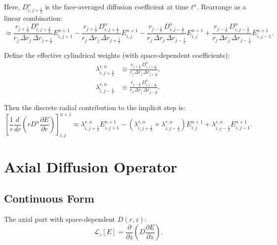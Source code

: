 \documentclass[12pt,oneside]{article}
\begin{document}
Here, $D^n_{i,j+\frac12}$ is the face-averaged diffusion coefficient at time $t^n$. Rearrange as a linear combination:
\begin{equation}
\approx
\frac{r_{j+\frac12}\,D^n_{i,j+\frac12}}{r_j\,\Delta r_j\,\Delta r_{j+\frac12}} E^{n+1}_{i,j+1}
-
\frac{r_{j+\frac12}\,D^n_{i,j+\frac12}}{r_j\,\Delta r_j\,\Delta r_{j+\frac12}} E^{n+1}_{i,j}
-
\frac{r_{j-\frac12}\,D^n_{i,j-\frac12}}{r_j\,\Delta r_j\,\Delta r_{j-\frac12}} E^{n+1}_{i,j}
+
\frac{r_{j-\frac12}\,D^n_{i,j-\frac12}}{r_j\,\Delta r_j\,\Delta r_{j-\frac12}} E^{n+1}_{i,j-1}.
\end{equation}

Define the effective cylindrical weights (with space-dependent coefficients):
\begin{align}
\lambda^{r,n}_{i,j+\frac12}
&\equiv
\frac{r_{j+\frac12}\,D^n_{i,j+\frac12}}{r_j\,\Delta r_j\,\Delta r_{j+\frac12}},\\
\lambda^{r,n}_{i,j-\frac12}
&\equiv
\frac{r_{j-\frac12}\,D^n_{i,j-\frac12}}{r_j\,\Delta r_j\,\Delta r_{j-\frac12}}.
\end{align}

Then the discrete radial contribution to the implicit step is:
\begin{equation}
\left[\frac{1}{r}\frac{d}{dr}\left(rD^n\frac{\partial E}{\partial r}\right)\right]_{i,j}^{n+1}
\approx
\lambda^{r,n}_{i,j+\frac12} E^{n+1}_{i,j+1}
-
\left(\lambda^{r,n}_{i,j+\frac12} + \lambda^{r,n}_{i,j-\frac12}\right) E^{n+1}_{i,j}
+
\lambda^{r,n}_{i,j-\frac12} E^{n+1}_{i,j-1}.
\label{eq:radial_stencil}
\end{equation}

\section{Axial Diffusion Operator}

\subsection{Continuous Form}

The axial part with space-dependent $D(r,z)$:
\begin{equation}
\mathcal{L}_z[E]
=
\frac{\partial}{\partial z}\left(D\frac{\partial E}{\partial z}\right).
\end{equation}
\end{document}
